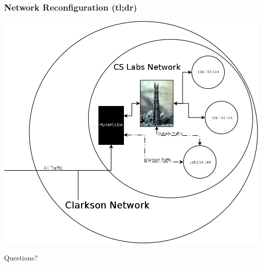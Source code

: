 \documentclass{beamer}
\begin{document}
\begin{frame}
  \frametitle{Network Reconfiguration (tl;dr)} 
  \includegraphics[height=\textheight]{diagrams/network.png}
\end{frame}

\begin{frame}
  \centerline{\huge{Questions?}}

\end{frame}
\end{document}
